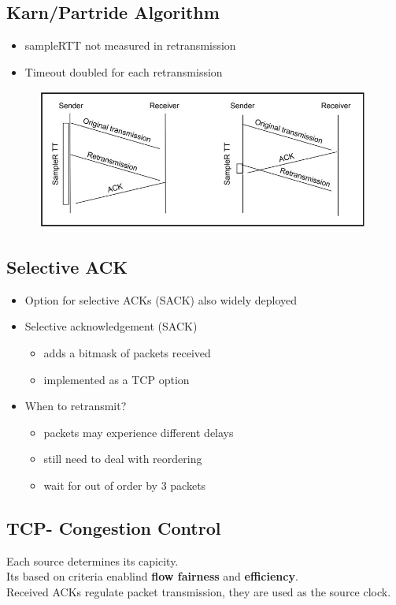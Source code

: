 \documentclass[../resumosRCOM.tex]{subfiles}
\begin{document}
\subsection{Karn/Partride Algorithm}
\begin{itemize}
    \item sampleRTT not measured in retransmission
    \item Timeout doubled for each retransmission
\end{itemize}
\begin{figure}[h]
    \centering
    \includegraphics[width=11cm]{images/trans10.JPG}
\end{figure}

\subsection{Selective ACK}
\begin{itemize}
    \item Option for selective ACKs (SACK) also widely deployed
    \item Selective acknowledgement (SACK)
    \begin{itemize}
        \item adds a bitmask of packets received
        \item implemented as a TCP option
    \end{itemize}
    \item When to retransmit?
    \begin{itemize}
        \item packets may experience different delays
        \item still need to deal with reordering
        \item wait for out of order by 3 packets
    \end{itemize}
\end{itemize}

\subsection{TCP- Congestion Control}
Each source determines its capicity.\\
Its based on criteria enablind \textbf{flow fairness} and \textbf{efficiency}.\\
Received ACKs regulate packet transmission, they are used as the source clock.\\
\end{document}
